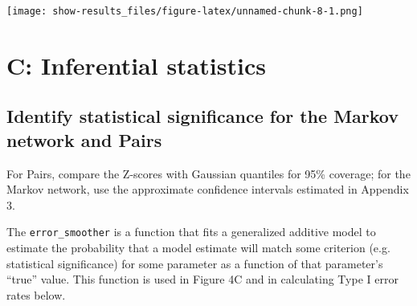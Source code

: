 \documentclass[11pt,]{article}
\newenvironment{Shaded}{\begin{snugshade}}{\end{snugshade}}
\newcommand{\KeywordTok}[1]{\textcolor[rgb]{0.13,0.29,0.53}{\textbf{{#1}}}}
\newcommand{\DecValTok}[1]{\textcolor[rgb]{0.00,0.00,0.81}{{#1}}}
\newcommand{\StringTok}[1]{\textcolor[rgb]{0.31,0.60,0.02}{{#1}}}
\newcommand{\CommentTok}[1]{\textcolor[rgb]{0.56,0.35,0.01}{\textit{{#1}}}}
\newcommand{\NormalTok}[1]{{#1}}
\begin{document}
\texttt{[image: show-results\_files/figure-latex/unnamed-chunk-8-1.png]}

\section{C: Inferential statistics}\label{c-inferential-statistics}

\subsection{Identify statistical significance for the Markov network and
Pairs}\label{identify-statistical-significance-for-the-markov-network-and-pairs}

For Pairs, compare the Z-scores with Gaussian quantiles for 95\%
coverage; for the Markov network, use the approximate confidence
intervals estimated in Appendix 3.

\begin{Shaded}
\end{Shaded}

The \texttt{error\_smoother} is a function that fits a generalized
additive model to estimate the probability that a model estimate will
match some criterion (e.g. statistical significance) for some parameter
as a function of that parameter's ``true'' value. This function is used
in Figure 4C and in calculating Type I error rates below.
\end{document}
